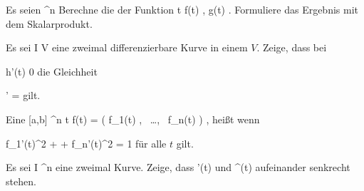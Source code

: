 \setcounter{section}{2}


{}
{

Es seien
 {\R} { \R^n
} {}
Berechne die
der Funktion
\maabbeledisp {} {\R} {\R
} { t } { \left\langle f(t) , g(t)  \right\rangle
} {.}
Formuliere das Ergebnis mit dem Skalarprodukt.

}
{} {}

{}
{

Es sei
 { I } { V
} {}
eine zweimal differenzierbare Kurve in einem
$V$. Zeige, dass bei

\mavergleichskette
{\vergleichskette
{h'(t)
}
{ \neq }{ 0
}
{  }{
}
{    }{
}
{   }{
}
}
{}{}{}
die Gleichheit

\mavergleichskettedisp
{\vergleichskette
{  \Vert'
}
{ =} { {  }  \Vert
}
{ } {
}
{ } {
}
{ } {
}
}
{}{}{}
gilt.

}
{} {}

Eine
 { [a,b] } {\R^n
} { t } {f(t) = \left( f_1(t)  , \,   \ldots  , \,  f_n(t)                 \right)
} {,}
heißt
wenn

\mavergleichskette
{\vergleichskette
{ f_1'(t)^2 + \cdots +  f_n'(t)^2
}
{ = }{ 1
}
{  }{
}
{    }{
}
{   }{
}
}
{}{}{}
für alle $t$ gilt.

{}
{

Es sei
\maabb {\gamma} { I } {\R^n
} {}
eine zweimal
Kurve. Zeige, dass
\mathkor {} {\gamma'(t)} {und} {\gamma^{\prime \prime}(t)} {}
aufeinander senkrecht stehen.

}
{} {}


